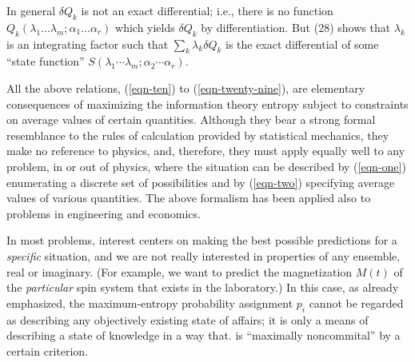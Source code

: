 \documentclass[]{article}
\begin{document}
In general \(\delta Q_{k}\) is not an exact differential; i.e., there is
no function
\(Q_{k}\left( \lambda_{1}\ldots\lambda_{m};\alpha_{1}\ldots\alpha_{r} \right)\)
which yields \(\delta Q_{k}\) by differentiation. But (28) shows that
\(\lambda_{k}\) is an integrating factor such that
\(\sum_{k} \lambda_{k}\delta Q_{k}\) is the exact
differential of some ``state function''
\(S\left( \lambda_{1}\cdots\lambda_{m};\alpha_{2}\cdots\alpha_{r} \right)\).

All the above relations, (\ref{eqn-ten}) to (\ref{eqn-twenty-nine}), are elementary consequences of
maximizing the information theory entropy subject to constraints on
average values of certain quantities. Although they bear a strong formal
resemblance to the rules of calculation provided by statistical
mechanics, they make no reference to physics, and, therefore, they must
apply equally well to any problem, in or out of physics, where the
situation can be described by (\ref{eqn-one}) enumerating a discrete set of
possibilities and by (\ref{eqn-two}) specifying average values of various
quantities. The above formalism has been applied also to problems in
engineering\citep{Jaynes-decipherability59} and economics.\citep{Jaynes-engineering63}

In most problems, interest centers on making the best possible
predictions for a \emph{specific} situation, and we are not really
interested in properties of any ensemble, real or imaginary. (For
example, we want to predict the magnetization \(M(t)\) of the
\emph{particular} spin system that exists in the laboratory.) In this
case, as already emphasized, the maximum-entropy probability assignment
\(p_{i}\) cannot be regarded as describing any objectively existing
state of affairs; it is only a means of describing a state of knowledge
in a way that. is ``maximally noncommital'' by a certain criterion.
\end{document}
